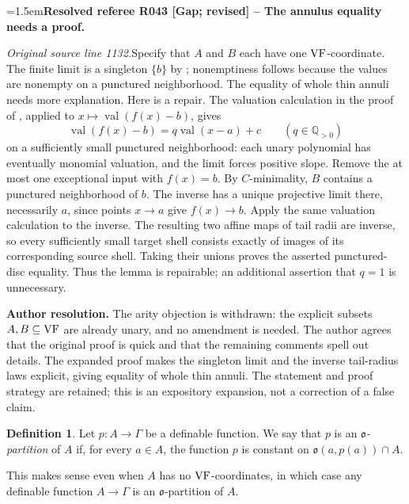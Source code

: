 \documentclass[12pt]{amsart}
\newcommand{\ResolvedRefereeRemark}[5]{%
  \par\medskip\begingroup\normalfont\small\color{gray}%
  \emergencystretch=1.5em\noindent\textbf{Resolved referee R#1 [#2] -- #3.}\par\nobreak\noindent #4\par
  \medskip\color{ResolutionGreen}\noindent\textbf{Author resolution.} #5\par
  \endgroup\medskip
}
\newcommand{\memph}[1]{{\color{magenta}\emph{#1}}}
\theoremstyle{plain}
\theoremstyle{definition}
\newtheorem{defn}[thm]{Definition}
\theoremstyle{remark}
\numberwithin{equation}{section}
\theoremstyle{plain}
\newcommand{\VF}{\textup{VF}}
\newcommand{\go}{\mathfrak{o}}
\newcommand{\0}{\emptyset}
\newcommand{\fun}{\longrightarrow}
\DeclareMathOperator{\vv}{val}
\begin{document}
\ResolvedRefereeRemark{043}{Gap; revised}{The annulus equality needs a proof}{%
\textit{Original source line 1132.}\quad Specify that $A$ and $B$ each have one $\VF$-coordinate. The finite limit is a singleton $\{b\}$ by \cite[Lemma~9.4]{Yin:special:trans}; nonemptiness follows because the values are nonempty on a punctured neighborhood. The equality of whole thin annuli needs more explanation. Here is a repair. The valuation calculation in the proof of \cite[Lemma~8.3]{Yin:special:trans}, applied to $x\mapsto\vv(f(x)-b)$, gives
\[
 \vv(f(x)-b)=q\vv(x-a)+c\qquad(q\in\mathbb Q_{>0})
\]
on a sufficiently small punctured neighborhood: each unary polynomial has eventually monomial valuation, and the limit forces positive slope. Remove the at most one exceptional input with $f(x)=b$. By $C$-minimality, $B$ contains a punctured neighborhood of $b$. The inverse has a unique projective limit there, necessarily $a$, since points $x\to a$ give $f(x)\to b$. Apply the same valuation calculation to the inverse. The resulting two affine maps of tail radii are inverse, so every sufficiently small target shell consists exactly of images of its corresponding source shell. Taking their unions proves the asserted punctured-disc equality. Thus the lemma is repairable; an additional assertion that $q=1$ is unnecessary.
}{The arity objection is withdrawn: the explicit subsets $A,B\subseteq\VF$ are already unary, and no amendment is needed. The author agrees that the original proof is quick and that the remaining comments spell out details. The expanded proof makes the singleton limit and the inverse tail-radius laws explicit, giving equality of whole thin annuli. The statement and proof strategy are retained; this is an expository expansion, not a correction of a false claim.}

\begin{defn}
Let $p : A \fun \Gamma$ be a definable function. We say that $p$ is an \memph{$\go$-partition} of $A$ if, for every $a \in A$, the function $p$ is constant on $\go(a, p(a)) \cap A$.
\end{defn}


This makes sense even when $A$ has no $\VF$-coordinates, in which case any definable function $A \fun \Gamma$ is an $\go$-partition of $A$.
\end{document}
